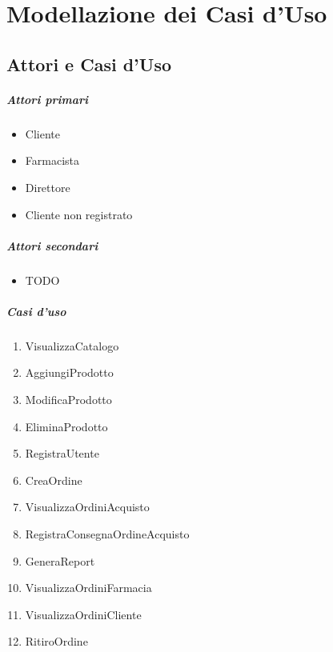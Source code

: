 \chapter{Modellazione dei Casi d'Uso}

\section{Attori e Casi d'Uso}

\paragraph{Attori primari}
\begin{itemize}
	\item Cliente
	\item Farmacista
	\item Direttore
	\item Cliente non registrato
\end{itemize}

\paragraph{Attori secondari}
\begin{itemize}
	\item TODO
\end{itemize}

\paragraph{Casi d'uso}
\begin{enumerate}
	\item VisualizzaCatalogo %
	\item AggiungiProdotto %
	\item ModificaProdotto %
	\item EliminaProdotto %
	\item RegistraUtente %
	\item CreaOrdine %
	\item VisualizzaOrdiniAcquisto %
	\item RegistraConsegnaOrdineAcquisto %
	\item GeneraReport %
	\item VisualizzaOrdiniFarmacia %
	\item VisualizzaOrdiniCliente %
	\item RitiroOrdine %
\end{enumerate}

